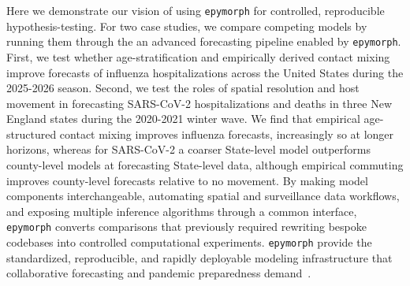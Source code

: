 Here we demonstrate our vision of using \texttt{epymorph} for controlled, reproducible hypothesis-testing. 
For two case studies, we compare competing models by running them through the an advanced forecasting pipeline enabled by \texttt{epymorph}.
First, we test whether age-stratification and empirically derived contact mixing improve forecasts of influenza hospitalizations across the United States during the 2025-2026 season. 
Second, we test the roles of spatial resolution and host movement in forecasting SARS-CoV-2 hospitalizations and deaths in three New England states during the 2020-2021 winter wave. 
We find that empirical age-structured contact mixing improves influenza forecasts, increasingly so at longer horizons, whereas for SARS-CoV-2 a coarser State-level model outperforms county-level models at forecasting State-level data, although empirical commuting improves county-level forecasts relative to no movement.
By making model components interchangeable, automating spatial and surveillance data workflows, and exposing multiple inference algorithms through a common interface, \texttt{epymorph} converts comparisons that previously required rewriting bespoke codebases into controlled computational experiments. 
\texttt{epymorph} provide the standardized, reproducible, and rapidly deployable modeling infrastructure that collaborative forecasting and pandemic preparedness demand~\citep{howerton_evaluation_2023,shea_harnessing_2020,reich_collaborative_2022}.
